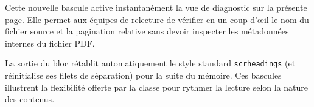 Cette nouvelle bascule active instantanément la vue de diagnostic sur la présente page.
Elle permet aux équipes de relecture de vérifier en un coup d'œil le nom du fichier source et la pagination relative sans devoir inspecter les métadonnées internes du fichier PDF.

\clearpage
\endgroup
\pagestyle{scrheadings}

La sortie du bloc rétablit automatiquement le style standard \texttt{scrheadings} (et réinitialise ses filets de séparation) pour la suite du mémoire.
Ces bascules illustrent la flexibilité offerte par la classe pour rythmer la lecture selon la nature des contenus.

